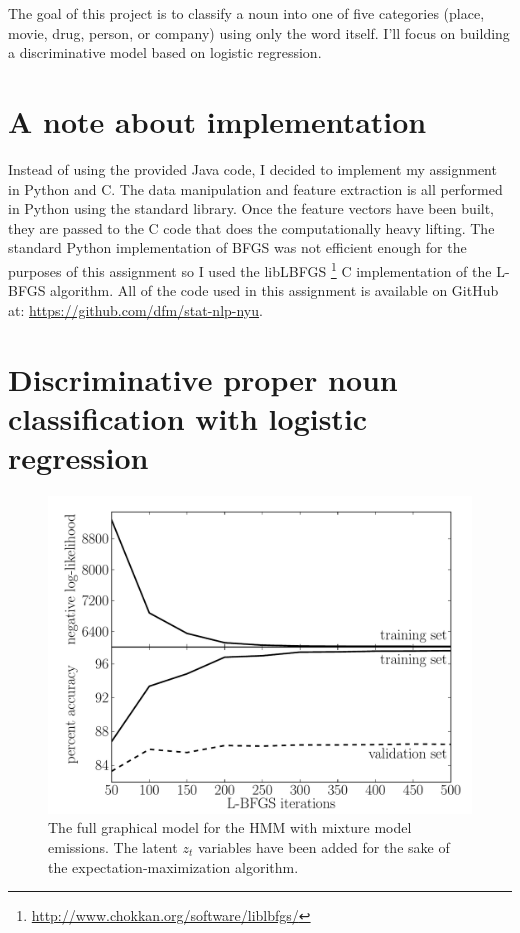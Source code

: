 \documentclass[11pt]{article}
\newcommand{\figlabel}[1]{\label{fig:#1}}
\newcommand{\code}[1]{{\sffamily #1}}
\begin{document}
The goal of this project is to classify a noun into one of five categories
(\code{place}, \code{movie}, \code{drug}, \code{person}, or \code{company})
using only the word itself.
I'll focus on building a discriminative model based on logistic regression.

\section{A note about implementation}

Instead of using the provided Java code, I decided to implement my assignment
in Python and C.
The data manipulation and feature extraction is all performed in Python using
the standard library.
Once the feature vectors have been built, they are passed to the C code that
does the computationally heavy lifting.
The standard Python implementation of \code{BFGS} was not efficient enough for
the purposes of this assignment so I used the \code{libLBFGS}%
\footnote{\url{http://www.chokkan.org/software/liblbfgs/}} C implementation
of the \code{L-BFGS} algorithm.
All of the code used in this assignment is available on GitHub at:
\url{https://github.com/dfm/stat-nlp-nyu}.

\section{Discriminative proper noun classification with logistic regression}

\begin{figure}[htbp]
\begin{center}
    \includegraphics[width=\textwidth]{full_500_convergence.pdf}
\end{center}
\caption{%
The full graphical model for the HMM with mixture model
emissions. The latent $z_t$ variables have been added for the sake of
the expectation-maximization algorithm.
\figlabel{full500}}
\end{figure}
\end{document}

